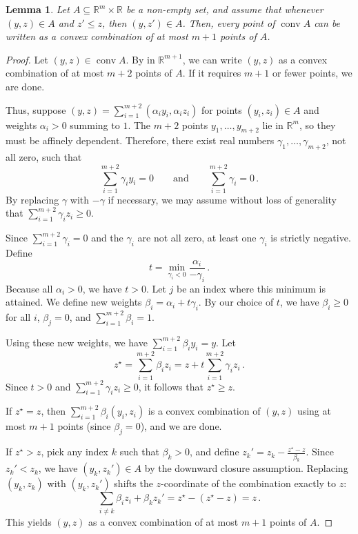 \documentclass[10pt,a4paper]{amsart}
\newtheorem{lemma}{Lemma}
\newcommand{\R}{\mathbb R}
\DeclareMathOperator{\conv}{conv}
\begin{document}
\begin{lemma}\label{lemma:caradown}
    Let $A\subseteq\R^m\times\R$ be a non-empty set, and assume that whenever $(y,z)\in A$ and $z'\leq z$, then $(y,z')\in A$. Then, every point of $\conv A$ can be written as a convex combination of at most $m+1$ points of $A$.
\end{lemma}

\begin{proof}
    Let $(y,z)\in\conv A$. By  in $\R^{m+1}$, we can write $(y,z)$ as a convex combination of at most $m+2$ points of $A$. If it requires $m+1$ or fewer points, we are done. 
    
    Thus, suppose $(y,z)=\sum_{i=1}^{m+2}(\alpha_i y_i,\alpha_i z_i)$ for points $(y_i,z_i)\in A$ and weights $\alpha_i>0$ summing to $1$. The $m+2$ points $y_1,\dots,y_{m+2}$ lie in $\R^m$, so they must be affinely dependent. Therefore, there exist real numbers $\gamma_1,\dots,\gamma_{m+2}$, not all zero, such that
    $$\sum_{i=1}^{m+2}\gamma_i y_i = 0 \qquad \text{and} \qquad \sum_{i=1}^{m+2}\gamma_i = 0\,.$$
    By replacing $\gamma$ with $-\gamma$ if necessary, we may assume without loss of generality that $\sum_{i=1}^{m+2}\gamma_i z_i \geq 0$. 
    
    Since $\sum_{i=1}^{m+2}\gamma_i=0$ and the $\gamma_i$ are not all zero, at least one $\gamma_i$ is strictly negative. Define
    $$t = \min_{\gamma_i < 0} \frac{\alpha_i}{-\gamma_i}\,.$$
    Because all $\alpha_i>0$, we have $t>0$. Let $j$ be an index where this minimum is attained. We define new weights $\beta_i = \alpha_i + t\gamma_i$. By our choice of $t$, we have $\beta_i \geq 0$ for all $i$, $\beta_j = 0$, and $\sum_{i=1}^{m+2}\beta_i = 1$. 
    
    Using these new weights, we have $\sum_{i=1}^{m+2}\beta_i y_i = y $. Let
    $$z^\star = \sum_{i=1}^{m+2}\beta_i z_i = z + t\sum_{i=1}^{m+2}\gamma_i z_i\,.$$
    Since $t>0$ and $\sum_{i=1}^{m+2}\gamma_i z_i \geq 0$, it follows that $z^\star \geq z$. 
    
    If $z^\star=z$, then $\sum_{i=1}^{m+2}\beta_i(y_i,z_i)$ is a convex combination of $(y,z)$ using at most $m+1$ points (since $\beta_j=0$), and we are done.
    
    If $z^\star>z$, pick any index $k$ such that $\beta_k>0$, and define $z_k' = z_k - \frac{z^\star-z}{\beta_k}$. Since $z_k'<z_k$, we have $(y_k,z_k')\in A$ by the downward closure assumption. Replacing $(y_k,z_k)$ with $(y_k,z_k')$ shifts the $z$-coordinate of the combination exactly to $z$:
    $$\sum_{i\neq k}\beta_i z_i + \beta_k z_k' = z^\star - (z^\star-z) = z\,.$$
    This yields $(y,z)$ as a convex combination of at most $m+1$ points of $A$.
\end{proof}
\end{document}
